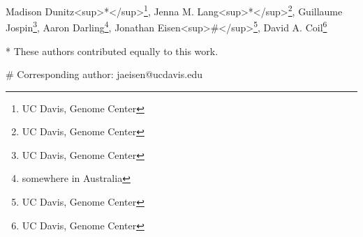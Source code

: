 Madison Dunitz<sup>*</sup>\footnote{UC Davis, Genome Center}, Jenna M. Lang<sup>*</sup>\footnote{UC Davis, Genome Center}, Guillaume Jospin\footnote{UC Davis, Genome Center}, Aaron Darling\footnote{somewhere in Australia}, Jonathan Eisen<sup>#</sup>\footnote{UC Davis, Genome Center}, David A. Coil\footnote{UC Davis, Genome Center} 

* These authors contributed equally to this work.

\# Corresponding author: jaeisen@ucdavis.edu